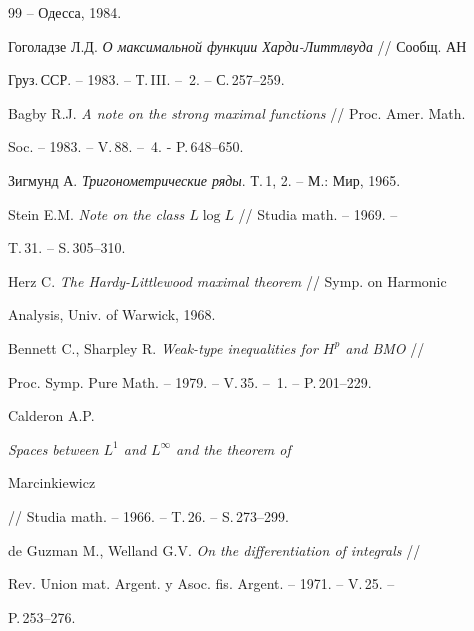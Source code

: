 \begin{thebibliography}{99}
-- Одесса, 1984.




Гоголадзе Л.Д. {\em О максимальной функции Харди-Литтлвуда} // Сообщ. АН 


Груз.\,ССР. -- 1983. -- Т.\,III. -- \No\,2. -- С.\,257--259. 






Bagby R.J. {\em A note on the strong maximal functions} // Proc. Amer. Math. 


Soc. -- 1983. -- V.\,88. -- \No\,4. - P.\,648--650. 




Зигмунд А. {\em Тригонометрические ряды}. Т.\,1, 2. -- М.: Мир, 1965.




Stein E.M. {\em Note on the class $L\log L$} // Studia math. -- 1969. -- 


T.\,31. -- S.\,305--310. 




Herz C. {\em The Hardy-Littlewood maximal theorem} // Symp. on Harmonic 


Analysis, Univ. of Warwick, 1968. 




Bennett C., Sharpley R. {\em Weak-type inequalities for $H^p$ and BMO} // 


Proc. Symp. Pure Math. -- 1979. -- V.\,35. -- \No\,1. -- P.\,201--229. 




Calderon A.P. {\em Spaces between $L^1$ and $L^\infty$ and the theorem of 


Marcinkiewicz} // Studia math. -- 1966. -- T.\,26. -- S.\,273--299. 




de Guzman M., Welland G.V. {\em On the differentiation of integrals} // 


Rev. Union mat. Argent. y Asoc. fis. Argent. -- 1971. -- V.\,25. -- 


P.\,253--276. 


 


\end{thebibliography} 


 


\vskip 2cm 


 






 




 


